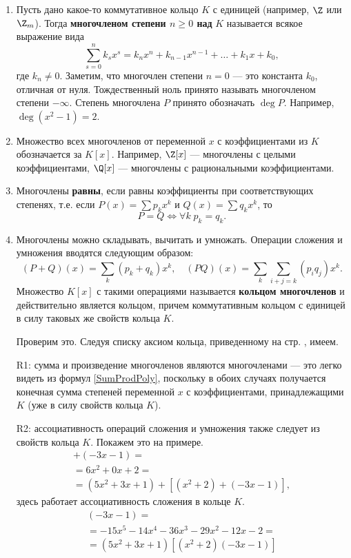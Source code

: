 \begin{enumerate}
\item Пусть дано какое-то коммутативное кольцо $K$ с единицей (например, $\Z$ или $\Z_m$). Тогда \textbf{многочленом степени $n\ge 0$ над} $K$ называется всякое выражение вида
$$
\sum_{s=0}^n k_sx^s = k_nx^n+k_{n-1}x^{n-1}+\dots+k_1x+k_0,
$$
где $k_n\ne 0$. Заметим, что многочлен степени $n=0$ --- это константа $k_0$, отличная от нуля. Тождественный ноль принято называть многочленом степени $-\infty$. Степень многочлена $P$ принято обозначать $\deg P$. Например, $\deg(x^2-1)=2$.
\item Множество всех многочленов от переменной $x$ с коэффициентами из $K$ обозначается за $K[x]$.
Например, $\Z[x]$ --- многочлены с целыми коэффициентами, $\Q[x]$ --- многочлены с рациональными коэффициентами.
\item Многочлены \textbf{равны}, если равны коэффициенты при соответствующих степенях, т.е. если $P(x)=\sum p_kx^k$ и $Q(x)=\sum q_kx^k$,
то
$$
P=Q\Leftrightarrow \forall k \; p_k=q_k.
$$
\item Многочлены можно складывать, вычитать и умножать. Операции сложения и умножения вводятся следующим образом:
\begin{equation}\label{SumProdPoly}
(P+Q)(x) = \sum_k(p_k+q_k)x^k,\quad (PQ)(x) = \sum_k\sum_{i+j=k}(p_iq_j)x^k.
\end{equation}
Множество $K[x]$ с такими операциями называется \textbf{кольцом многочленов} и действительно является кольцом, причем коммутативным кольцом с единицей в силу таковых же свойств кольца $K$.

Проверим это. Следуя списку аксиом кольца, приведенному на стр. \pageref{Ring}, имеем.

R1: сумма и произведение многочленов являются многочленами --- это легко видеть из формул \eqref{SumProdPoly}, поскольку в обоих случаях получается конечная сумма степеней переменной $x$ с коэффициентами, принадлежащими $K$ (уже в силу свойств кольца $K$).

R2: ассоциативность операций сложения и умножения также следует из свойств кольца $K$. Покажем это на примере.
\begin{multline*}
[(5x^2+3x+1)+(x^2+2)]+(-3x-1) = \\
= 6x^2 + 0x + 2  = \\
= (5x^2+3x+1)+[(x^2+2)+(-3x-1)],
\end{multline*}
здесь работает ассоциативность сложения в кольце $K$.
\begin{multline*}
[(5x^2+3x+1)(x^2+2)](-3x-1) = \\
= -15x^5-14x^4-36x^3-29x^2-12x-2 = \\
= (5x^2+3x+1)[(x^2+2)(-3x-1)]
\end{multline*}


\end{enumerate}
